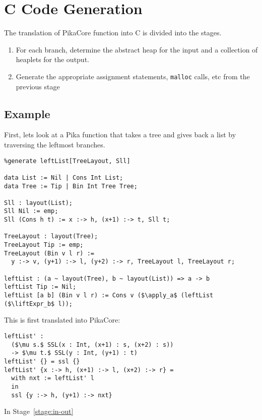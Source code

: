 \section{C Code Generation}

The translation of PikaCore function into C is divided into the stages.

\begin{enumerate}
  \item \label{stage:in-out} For each branch, determine the abstract heap for the input and a collection of
    heaplets for the output.
  \item Generate the appropriate assignment statements, \verb|malloc| calls, etc from the
    previous stage
\end{enumerate}

\subsection{Example}
First, lets look at a Pika function that takes a tree and gives back a list by traversing the leftmost branches.

\begin{lstlisting}
%generate leftList[TreeLayout, Sll]

data List := Nil | Cons Int List;
data Tree := Tip | Bin Int Tree Tree;

Sll : layout(List);
Sll Nil := emp;
Sll (Cons h t) := x :-> h, (x+1) :-> t, Sll t;

TreeLayout : layout(Tree);
TreeLayout Tip := emp;
TreeLayout (Bin v l r) :=
  y :-> v, (y+1) :-> l, (y+2) :-> r, TreeLayout l, TreeLayout r;

leftList : (a ~ layout(Tree), b ~ layout(List)) => a -> b
leftList Tip := Nil;
leftList [a b] (Bin v l r) := Cons v ($\apply_a$ (leftList ($\liftExpr_b$ l));
\end{lstlisting}

\noindent
This is first translated into PikaCore:

\begin{lstlisting}
leftList' :
  ($\mu s.$ SSL(x : Int, (x+1) : s, (x+2) : s))
  -> $\mu t.$ SSL(y : Int, (y+1) : t)
leftList' {} = ssl {}
leftList' {x :-> h, (x+1) :-> l, (x+2) :-> r} =
  with nxt := leftList' l
  in
  ssl {y :-> h, (y+1) :-> nxt}
\end{lstlisting}

\noindent
In Stage~\ref{stage:in-out}

